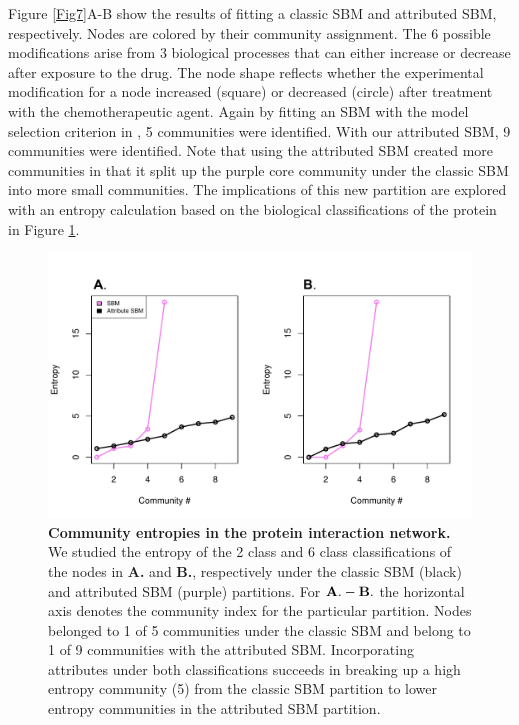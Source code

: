 Figure \ref{Fig7}A-B show the results of fitting a classic SBM and attributed SBM, respectively. Nodes are colored by their community assignment. The 6 possible modifications arise from 3 biological processes that can either increase or decrease after exposure to the drug. The node shape reflects whether the experimental modification for a node increased (square) or decreased (circle) after treatment with the chemotherapeutic agent. Again by fitting an SBM with the model selection criterion in \cite{dudin}, 5 communities were identified. With our attributed SBM, 9 communities were identified. Note that using the attributed SBM created more communities in that it split up the purple core community under the classic SBM into more small communities. The implications of this new partition are explored with an entropy calculation based on the biological classifications of the protein in Figure \ref{entropyFig}.
 \begin{figure}[h!]
\begin{center}
\includegraphics[width=1\textwidth]{EntropyCalc_6Classleft_2classright.pdf}
\caption{{\bf Community entropies in the protein interaction network.} We studied the entropy of the 2 class and 6 class classifications of the nodes in {\bf A.} and {\bf B.}, respectively under the classic SBM (black) and attributed SBM (purple) partitions. For ${\bf A.-B.}$ the horizontal axis denotes the community index for the particular partition. Nodes belonged to 1 of 5 communities under the classic SBM and belong to 1 of 9 communities with the attributed SBM. Incorporating attributes under both classifications succeeds in breaking up a high entropy community (5) from the classic SBM partition to lower entropy communities in the attributed SBM partition. }
\label{entropyFig} %
\end{center}
\end{figure}

